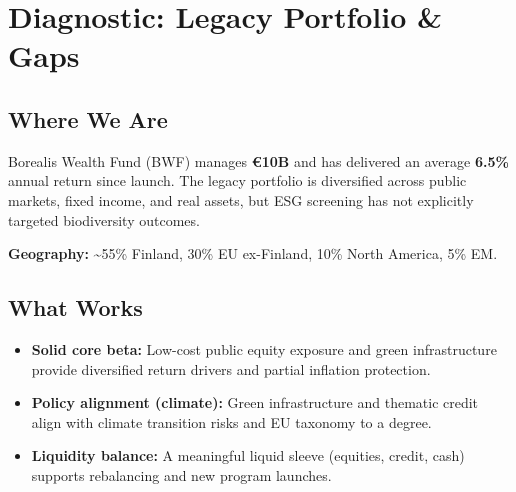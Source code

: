 \section*{Diagnostic: Legacy Portfolio \& Gaps}

\subsection*{Where We Are}
Borealis Wealth Fund (BWF) manages \textbf{€10B} and has delivered an average \textbf{6.5\%} annual return since launch. The legacy portfolio is diversified across public markets, fixed income, and real assets, but ESG screening has not explicitly targeted biodiversity outcomes.

\begin{table}[h!]
\centering
{}
\caption{Legacy portfolio overview by strategic sleeve (percent shares inferred from case totals).}
\end{table}

\noindent \textbf{Geography:} \textasciitilde 55\% Finland, 30\% EU ex-Finland, 10\% North America, 5\% EM.

\vspace{0.5em}
\subsection*{What Works}
\begin{itemize}[leftmargin=*, itemsep=2pt]
    \item \textbf{Solid core beta:} Low-cost public equity exposure and green infrastructure provide diversified return drivers and partial inflation protection.
    \item \textbf{Policy alignment (climate):} Green infrastructure and thematic credit align with climate transition risks and EU taxonomy to a degree.
    \item \textbf{Liquidity balance:} A meaningful liquid sleeve (equities, credit, cash) supports rebalancing and new program launches.
\end{itemize}
